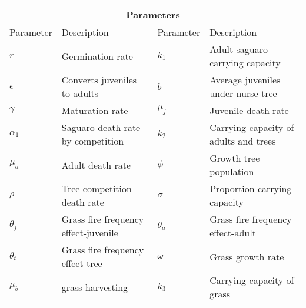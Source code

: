 
\setlength{\arrayrulewidth}{.3mm}
\setlength{\tabcolsep}{20pt}
\renewcommand{\arraystretch}{1.5}


{\tiny \centering \hspace{-.8cm}\begin{tabular}{ |p{2cm}|p{6.5cm}| p{2cm}| p{6.5cm}|}

\hline
\multicolumn{4}{|c|}{Parameters} \\
\hline
Parameter& Description & Parameter & Description\\
\hline
$r$ & Germination rate & $k_1$& Adult saguaro carrying capacity\\
\hline

$\epsilon$ & Converts juveniles to adults & $b$ & Average juveniles under nurse tree\\
\hline

$\gamma$& Maturation rate & $\mu_j$ & Juvenile death rate\\
\hline

$\alpha_1$& Saguaro death rate by competition & $k_2$ & Carrying capacity of adults and trees\\
\hline

$\mu_a$ & Adult death rate & $\phi$ & Growth tree population\\
\hline
$\rho$ & Tree competition death rate & $\sigma$ & Proportion carrying capacity\\
\hline
$\theta_j$ & Grass fire frequency effect-juvenile& $\theta_a$ & Grass fire frequency effect-adult\\
\hline
$\theta_t$ &Grass fire frequency effect-tree & $\omega$ & Grass growth rate\\
\hline
$\mu_b$ & grass harvesting & $k_3$ & Carrying capacity of grass\\
\hline
 \hline 
\end{tabular}}
